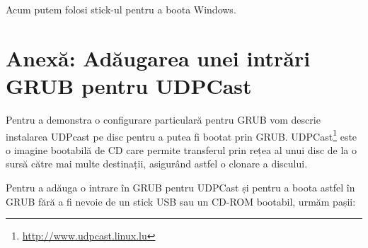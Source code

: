 Acum putem folosi stick-ul pentru a boota Windows.

\section{Anexă: Adăugarea unei intrări GRUB pentru UDPCast}
\label{sec:boot-grubconfig}

Pentru a demonstra o configurare particulară pentru GRUB vom descrie instalarea
UDPcast pe disc pentru a putea fi bootat prin GRUB.
UDPCast\footnote{\url{http://www.udpcast.linux.lu}} este o imagine bootabilă de
CD care permite transferul prin rețea al unui disc de la o sursă către mai multe
destinații, asigurând astfel o clonare a discului.

Pentru a adăuga o intrare în GRUB pentru UDPCast și pentru a boota astfel în
GRUB fără a fi nevoie de un stick USB sau un CD-ROM bootabil, urmăm pașii:

